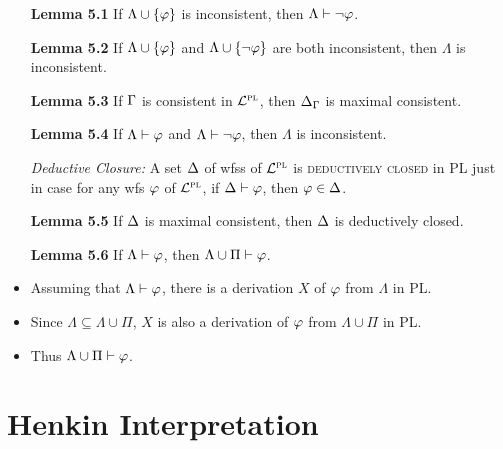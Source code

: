 \documentclass[a4paper, 11pt]{article} %
\begin{document}
\begin{itemize}
  \item[\bf Lemma 5.1] If $\Lambda\cup\lbrace\varphi\rbrace$ is inconsistent, then $\Lambda\vdash\neg\varphi$.
  \item[\bf Lemma 5.2] If $\Lambda \cup \lbrace\varphi\rbrace$ and $\Lambda\cup \lbrace\neg\varphi\rbrace$ are both inconsistent, then $\Lambda$ is inconsistent.
  \item[\bf Lemma 5.3] If $\Gamma$ is consistent in $\mathcal{L}^{\textsc{pl}}$, then $\Delta_{\Gamma}$ is maximal consistent. 
  \item[\bf Lemma 5.4] If $\Lambda\vdash\varphi$ and $\Lambda\vdash\neg\varphi$, then $\Lambda$ is inconsistent.
  \item[\it Deductive Closure:] A set $\Delta$ of wfss of $\mathcal{L}^{\textsc{pl}}$ is \textsc{deductively closed} in PL just in case for any wfs $\varphi$ of $\mathcal{L}^{\textsc{pl}}$, if $\Delta\vdash\varphi$, then $\varphi\in\Delta$.
  \item[\bf Lemma 5.5] If $\Delta$ is maximal consistent, then $\Delta$ is deductively closed.
  \item[\bf Lemma 5.6] If $\Lambda\vdash\varphi$, then $\Lambda\cup\Pi\vdash\varphi$.
    \item Assuming that $\Lambda\vdash\varphi$, there is a derivation $X$ of $\varphi$ from $\Lambda$ in PL.
    \item Since $\Lambda\subseteq\Lambda\cup\Pi$, $X$ is also a derivation of $\varphi$ from $\Lambda\cup\Pi$ in PL.
    \item Thus $\Lambda\cup\Pi\vdash\varphi$. 
\end{itemize}





\section*{Henkin Interpretation}
\end{document}
